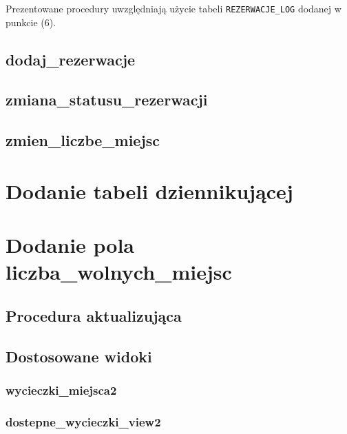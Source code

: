 \documentclass[12pt]{article}
\begin{document}
Prezentowane procedury uwzględniają użycie tabeli \texttt{REZERWACJE\_LOG} dodanej w punkcie (6).

\subsection{dodaj\_rezerwacje}


\subsection{zmiana\_statusu\_rezerwacji}


\subsection{zmien\_liczbe\_miejsc}


\section{Dodanie tabeli dziennikującej}



\section{Dodanie pola liczba\_wolnych\_miejsc}



\subsection{Procedura aktualizująca}


\subsection{Dostosowane widoki}

\subsubsection{wycieczki\_miejsca2}


\subsubsection{dostepne\_wycieczki\_view2}

\end{document}
